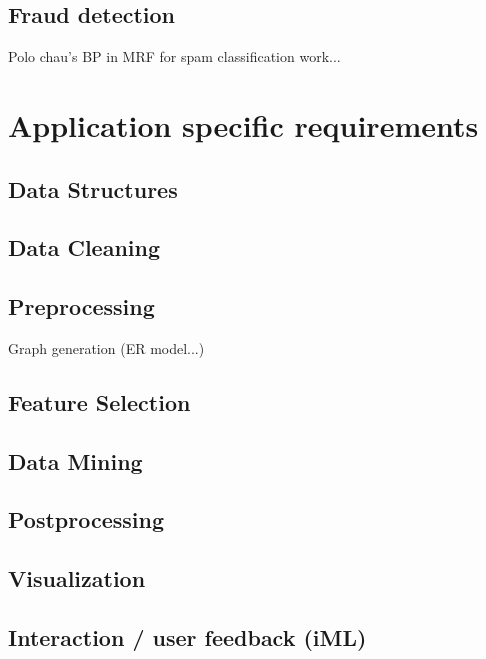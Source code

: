 	
	\subsection{Fraud detection}
	\label{ssect:fraud_detection}

	Polo chau's BP in MRF for spam classification work...

\section{Application specific requirements}
\label{section:app_requirements}

	\subsection{Data Structures}
	\label{ssect:data_gathering}
	
	\subsection{Data Cleaning}
	\label{ssect:data_cleaning}
	
	\subsection{Preprocessing}
	\label{ssect:preprocessing}
	
	Graph generation (ER model...)
	
	\subsection{Feature Selection}
	\label{ssect:feature_selection}
	
	\subsection{Data Mining}
	\label{ssect:data_mining}
	
	\subsection{Postprocessing}
	\label{ssect:postprocessing}
	
	\subsection{Visualization}
	\label{ssect:visualization}
	
	\subsection{Interaction / user feedback (iML)}
	\label{ssect:interaction}
	